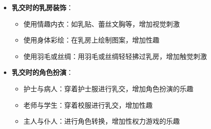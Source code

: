 \documentclass[12pt,UTF8]{ctexbook}
\begin{document}
\begin{itemize}
\begin{itemize}
		\item \textbf{乳交时的乳房装饰}：
		\begin{itemize}
			\item 使用情趣内衣：如乳贴、蕾丝文胸等，增加视觉刺激
			\item 使用身体彩绘：在乳房上绘制图案，增加性趣
			\item 使用羽毛或丝绸：用羽毛或丝绸轻轻拂过乳房，增加触觉刺激
		\end{itemize}
		\item \textbf{乳交时的角色扮演}：
		\begin{itemize}
			\item 护士与病人：穿着护士服进行乳交，增加角色扮演的乐趣
			\item 老师与学生：穿着校服进行乳交，增加性趣
			\item 主人与仆人：进行角色转换，增加性权力游戏的乐趣
		\end{itemize}
	\end{itemize}
\end{itemize}
\end{document}
